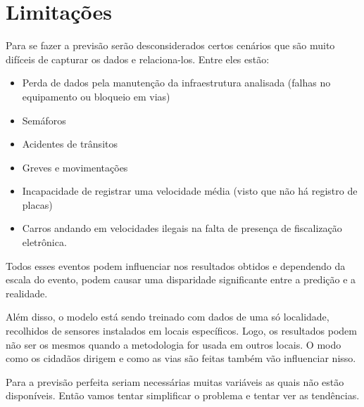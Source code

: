 \section{Limitações}
Para se fazer a previsão serão desconsiderados certos cenários que são muito difíceis de capturar os dados e relaciona-los. Entre eles estão:
\begin{itemize}
    \item Perda de dados pela manutenção da infraestrutura analisada (falhas no equipamento ou bloqueio em vias)
    \item Semáforos
    \item Acidentes de trânsitos
    \item Greves e movimentações
    \item Incapacidade de registrar uma velocidade média (visto que não há registro de placas)
    \item Carros andando em velocidades ilegais na falta de presença de fiscalização eletrônica.
\end{itemize}
Todos esses eventos podem influenciar nos resultados obtidos e dependendo da escala do evento, podem causar uma disparidade significante entre a predição e a realidade.

Além disso, o modelo está sendo treinado com dados de uma só localidade, recolhidos de sensores instalados em locais específicos. Logo, os resultados podem não ser os mesmos quando a metodologia for usada em outros locais. O modo como os cidadãos dirigem e como as vias são feitas também vão influenciar nisso.

Para a previsão perfeita seriam necessárias muitas variáveis as quais não estão disponíveis. Então vamos tentar simplificar o problema e tentar ver as tendências.
